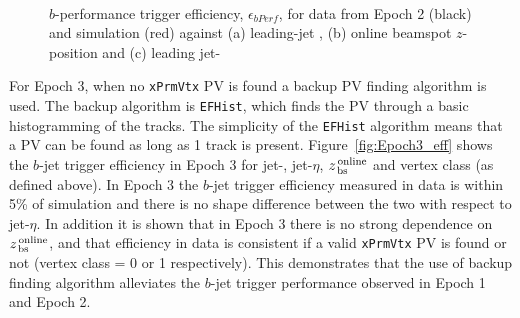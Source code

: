 \begin{figure}[!ht]
\begin{center}
  \\
\end{center}
\caption{$b$-performance trigger efficiency, $\epsilon_{bPerf}$, for data from Epoch 2 (black) and simulation (red) against (a) leading-jet \pT{}, (b) online beamspot $z$-position
and (c) leading jet-\eta}
\label{fig:Epoch2_bperf}
\end{figure}


For Epoch 3, when no \verb|xPrmVtx| PV is found a backup PV finding algorithm is used.
The backup algorithm is \verb|EFHist|, which finds the PV through a basic histogramming of the tracks.
The simplicity of the \verb|EFHist| algorithm means that a PV can be found as long as 1 track is present.
Figure~\ref{fig:Epoch3_eff} shows the $b$-jet trigger efficiency in Epoch 3 for jet-\pT, jet-$\eta$,  $z_{\,\text{bs}}^{\text{\,online}}$ and vertex class (as defined above).
In Epoch 3 the $b$-jet trigger efficiency measured in data is within 5\% of simulation and there is no shape difference between the two with respect to jet-$\eta$.
In addition it is shown that in Epoch 3 there is no strong dependence on  $z_{\,\text{bs}}^{\text{\,online}}$,
and that efficiency in data is consistent if a valid \verb|xPrmVtx| PV is found or not (vertex class = 0 or 1 respectively).
This demonstrates that the use of backup finding algorithm alleviates the $b$-jet trigger performance observed in Epoch 1 and Epoch 2.

